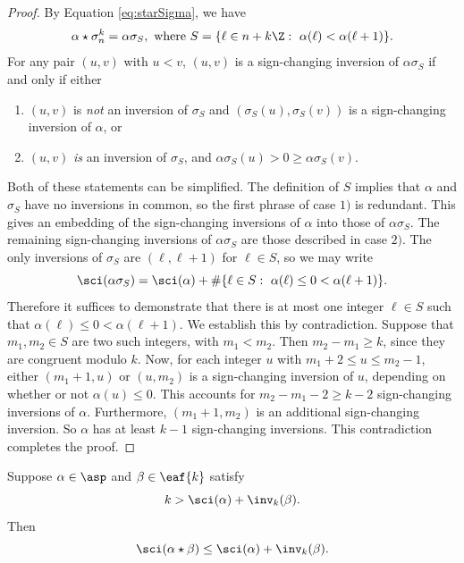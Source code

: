 \begin{proof}
By Equation \eqref{eq:starSigma}, we have
$$\alpha \star \sigma^k_n = \alpha \sigma_S,
\mbox{ where }
S = \{ \ell \in n + k \Z:\ \alpha(\ell) < \alpha(\ell+1)\}.$$
For any pair $(u,v)$ with $u < v$, $(u,v)$ is a sign-changing inversion of $\alpha \sigma_S$ if and only if either
\begin{enumerate}[label = \arabic*)]
    \item $(u,v)$ is \emph{not} an inversion of $\sigma_S$ and $(\sigma_S(u), \sigma_S(v))$ is a sign-changing inversion of $\alpha$, or
    \item $(u,v)$ \emph{is} an inversion of $\sigma_S$, and $\alpha \sigma_S (u) > 0 \geq \alpha \sigma_S(v)$.
\end{enumerate}
Both of these statements can be simplified. The definition of $S$ implies that $\alpha$ and $\sigma_S$ have no inversions in common, so the first phrase of case $1)$ is redundant. This gives an embedding of the sign-changing inversions of $\alpha$ into those of $\alpha \sigma_S$. The remaining sign-changing inversions of $\alpha \sigma_S$ are those described in case $2)$. The only inversions of $\sigma_S$ are $(\ell,\ell+1)$ for $\ell \in S$, so we may write
$$\sci(\alpha \sigma_S) = \sci(\alpha) + \# \{ \ell \in S:\ \alpha(\ell) \leq 0 < \alpha(\ell+1) \}.$$
Therefore it suffices to demonstrate that there is at most one integer $\ell \in S$ such that $\alpha(\ell) \leq 0 < \alpha(\ell+1)$. We establish this by contradiction. Suppose that $m_1, m_2 \in S$ are two such integers, with $m_1 < m_2$. Then $m_2 - m_1 \geq k$, since they are congruent modulo $k$. Now, for each integer $u$ with $m_1+2 \leq u \leq m_2-1$, either $(m_1+1,u)$ or $(u,m_2)$ is a sign-changing inversion of $u$, depending on whether or not $\alpha(u) \leq 0$. This accounts for $m_2-m_1-2  \geq k-2$ sign-changing inversions of $\alpha$. Furthermore, $(m_1+1,m_2)$ is an additional sign-changing inversion. So $\alpha$ has at least $k-1$ sign-changing inversions. This contradiction completes the proof.
\end{proof}

\begin{prop}
\label{prop:sciInvStar}
Suppose $\alpha \in \asp$ and $\beta \in \eaf{k}$ satisfy
$$k > \sci(\alpha) + \inv_k(\beta).$$
Then
$$\sci(\alpha \star \beta) \leq \sci(\alpha) + \inv_k(\beta).$$
\end{prop}

